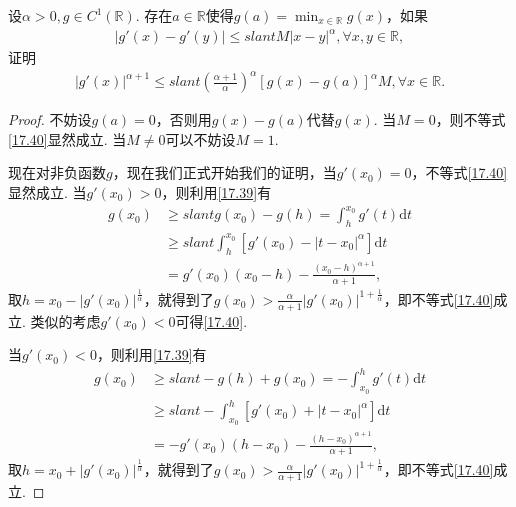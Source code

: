 \documentclass[../../main.tex]{subfiles}
\begin{document}
\begin{lemma}\label{lemma:g'(x)的Hölder连续相关结论}
设$\alpha>0, g\in C^1(\mathbb{R})$. 存在$a\in\mathbb{R}$使得$g(a)=\min_{x\in\mathbb{R}}g(x)$，如果
\begin{align}
|g'(x) - g'(y)| \leqslant slant M|x - y|^{\alpha}, \forall x,y\in\mathbb{R}, \label{17.39}
\end{align}
证明
\begin{align}
|g'(x)|^{\alpha + 1} \leqslant slant \left(\frac{\alpha + 1}{\alpha}\right)^{\alpha}[g(x) - g(a)]^{\alpha}M, \forall x\in\mathbb{R}. \label{17.40}
\end{align}
\end{lemma}
\begin{proof}
不妨设$g(a)=0$，否则用$g(x) - g(a)$代替$g(x)$. 当$M = 0$，则不等式\eqref{17.40}显然成立. 当$M\neq0$可以不妨设$M = 1$.

现在对非负函数$g$，现在我们正式开始我们的证明，当$g'(x_0)=0$，不等式\eqref{17.40}显然成立. 当$g'(x_0)>0$，则利用\eqref{17.39}有
\begin{align*}
g(x_0) &\geqslant slant g(x_0) - g(h)=\int_{h}^{x_0}g'(t)\mathrm{d}t \\
&\geqslant slant \int_{h}^{x_0}[g'(x_0) - |t - x_0|^{\alpha}]\mathrm{d}t \\
&= g'(x_0)(x_0 - h)-\frac{(x_0 - h)^{\alpha + 1}}{\alpha + 1},
\end{align*}
取$h = x_0 - |g'(x_0)|^{\frac{1}{\alpha}}$，就得到了$g(x_0)>\frac{\alpha}{\alpha + 1}|g'(x_0)|^{1 + \frac{1}{\alpha}}$，即不等式\eqref{17.40}成立. 类似的考虑$g'(x_0)<0$可得\eqref{17.40}.

当$g'(x_0)<0$，则利用\eqref{17.39}有
\begin{align*}
g(x_0) &\geqslant slant -g(h) + g(x_0)=-\int_{x_0}^{h}g'(t)\mathrm{d}t \\
&\geqslant slant -\int_{x_0}^{h}[g'(x_0) + |t - x_0|^{\alpha}]\mathrm{d}t \\
&= -g'(x_0)(h - x_0)-\frac{(h - x_0)^{\alpha + 1}}{\alpha + 1},
\end{align*}
取$h = x_0 + |g'(x_0)|^{\frac{1}{\alpha}}$，就得到了$g(x_0)>\frac{\alpha}{\alpha + 1}|g'(x_0)|^{1 + \frac{1}{\alpha}}$，即不等式\eqref{17.40}成立. 
\end{proof}
\end{document}
